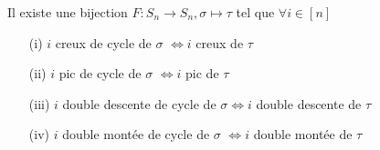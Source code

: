 			\begin{proposition}
				Il existe une bijection 
				$F:S_{n}\longrightarrow S_{n},\sigma\longmapsto\tau$ tel que $\forall i\in [n]$
				\begin{itemize}
					\item[(i)] $i$ creux de cycle de $\sigma$ $\Longleftrightarrow i$ creux de $\tau$
					\item[(ii)] $i$ pic de cycle de $\sigma$ $\Longleftrightarrow i$ pic de $\tau$
					\item[(iii)] $i$ double descente de cycle de $\sigma$$\Longleftrightarrow i$ double descente de $\tau$
					\item[(iv)] $i$ double montée de cycle de $\sigma$ $\Longleftrightarrow i$ double montée de $\tau$
				\end{itemize}
			\end{proposition}

